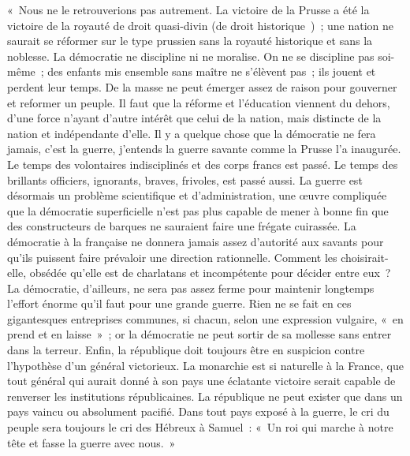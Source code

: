 \documentclass[french,twoside]{book} %
\newenvironment{quoteblock}%
  {\begin{quoting}}
  {\end{quoting}}
\newenvironment{quotebar}{%
    \def\FrameCommand{{\color{rubric!10!}\vrule width 0.5em} \hspace{0.9em}}%
    \def\OuterFrameSep{\itemsep} %
    \MakeFramed {\advance\hsize-\width \FrameRestore}
  }%
  {%
    \endMakeFramed
  }
\renewenvironment{quoteblock}%
  {%
    \savenotes
    \setstretch{0.9}
    \normalfont
    \begin{quotebar}
  }
  {%
    \end{quotebar}
    \spewnotes
  }
\begin{document}
\begin{quoteblock}
 « Nous ne le retrouverions pas autrement. La victoire de la Prusse a été la victoire de la royauté de droit quasi-divin (de droit historique ) ; une nation ne saurait se réformer sur le type prussien sans la royauté historique et sans la noblesse. La démocratie ne discipline ni ne moralise. On ne se discipline pas soi-même ; des enfants mis ensemble sans maître ne s’élèvent pas ; ils jouent et perdent leur temps. De la masse ne peut émerger assez de raison pour gouverner et reformer un peuple. Il faut que la réforme et l’éducation viennent du dehors, d’une force n’ayant d’autre intérêt que celui de la nation, mais distincte de la nation et indépendante d’elle. Il y a quelque chose que la démocratie ne fera jamais, c’est la guerre, j’entends la guerre savante comme la Prusse l’a inaugurée. Le temps des volontaires indisciplinés et des corps francs est passé. Le temps des brillants officiers, ignorants, braves, frivoles, est passé aussi. La guerre est désormais un problème scientifique et d’administration, une œuvre compliquée que la démocratie superficielle n’est pas plus capable de mener à bonne fin que des constructeurs de barques ne sauraient faire une frégate cuirassée. La démocratie à la française ne donnera jamais assez d’autorité aux savants pour qu’ils puissent faire prévaloir une direction rationnelle. Comment les choisirait-elle, obsédée qu’elle est de charlatans et incompétente pour décider entre eux ? La démocratie, d’ailleurs, ne sera pas assez ferme pour maintenir longtemps l’effort énorme qu’il faut pour une grande guerre. Rien ne se fait en ces gigantesques entreprises communes, si chacun, selon une expression vulgaire, « en prend et en laisse » ; or la démocratie ne peut sortir de sa mollesse sans entrer dans la terreur. Enfin, la république doit toujours être en suspicion contre l’hypothèse d’un général victorieux. La monarchie est si naturelle à la France, que tout général qui aurait donné à son pays une éclatante victoire serait capable de renverser les institutions républicaines. La république ne peut exister que dans un pays vaincu ou absolument pacifié. Dans tout pays exposé à la guerre, le cri du peuple sera toujours le cri des Hébreux à Samuel : « Un roi qui marche à notre tête et fasse la guerre avec nous. » \par

\end{quoteblock}
\end{document}
